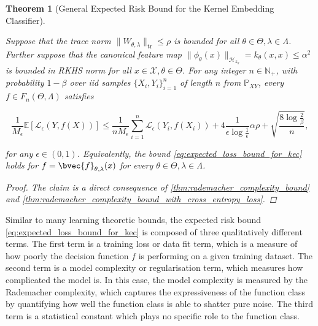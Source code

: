 \documentclass{article}
\newtheorem{theorem}{Theorem}[section]
\begin{document}
		\begin{theorem}[General Expected Risk Bound for the Kernel Embedding Classifier]
			\label{thm:expected_loss_bound_for_kec}
			
			Suppose that the trace norm $\| W_{\theta, \lambda} \|_{\mathrm{tr}} \leq \rho$ is bounded for all $\theta \in \Theta, \lambda \in \Lambda$. Further suppose that the canonical feature map $\| \phi_{\theta}(x) \|_{\mathcal{H}_{k_{\theta}}} = k_{\theta}(x, x) \leq \alpha^{2}$ is bounded in RKHS norm for all $x \in \mathcal{X}, \theta \in \Theta$. For any integer $n \in \mathbb{N}_{+}$, with probability $1 - \beta$ over \textit{iid} samples $\{X_{i}, Y_{i}\}_{i = 1}^{n}$ of length $n$ from $\mathbb{P}_{X Y}$, every $f \in F_{n}(\Theta, \Lambda)$ satisfies
			
			\begin{equation}
				\frac{1}{M_{\epsilon}} \mathbb{E}[\mathcal{L}_{\epsilon}(Y, f(X))] \leq \frac{1}{n M_{\epsilon}} \sum_{i = 1}^{n} \mathcal{L}_{\epsilon}(Y_{i}, f(X_{i})) + 4 \frac{1}{\epsilon \log{\frac{1}{\epsilon}}} \alpha \rho + \sqrt{\frac{8 \log{\frac{2}{\beta}}}{n}},
			\label{eq:expected_loss_bound_for_kec}
			\end{equation}
			
			for any $\epsilon \in (0, 1)$. Equivalently, the bound \eqref{eq:expected_loss_bound_for_kec} holds for $f = \bvec{f}_{\theta, \lambda}(x)$ for every $\theta \in \Theta, \lambda \in \Lambda$.
	
			\begin{proof}
				The claim is a direct consequence of \cref{thm:rademacher_complexity_bound} and \cref{thm:rademacher_complexity_bound_with_cross_entropy_loss}.
			\end{proof}
		\end{theorem}

		Similar to many learning theoretic bounds, the expected risk bound \eqref{eq:expected_loss_bound_for_kec} is composed of three qualitatively different terms. The first term is a training loss or data fit term, which is a measure of how poorly the decision function $f$ is performing on a given training dataset. The second term is a model complexity or regularisation term, which measures how complicated the model is. In this case, the model complexity is measured by the Rademacher complexity, which captures the expressiveness of the function class by quantifying how well the function class is able to shatter pure noise. The third term is a statistical constant which plays no specific role to the function class.
		
\end{document}
